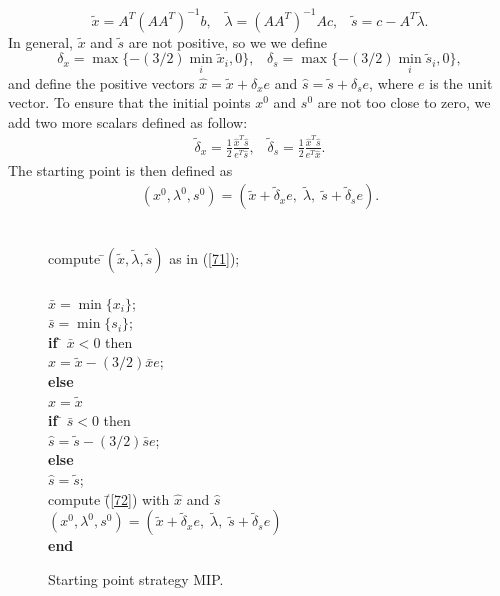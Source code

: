 \documentclass[a4paper,10 pt,titlepage,twoside]{book}
\theoremstyle{plain}
\theoremstyle{definition}
\theoremstyle{remark}
\begin{document}
\begin{equation}\label{71}
\tilde{x} = A^{T}(AA^{T})^{-1}b,\;\;\;\tilde{\lambda}=(AA^{T})^{-1}Ac,\;\;\; \tilde{s} = c- A^{T}\tilde{\lambda}.
\end{equation}
In general, $\tilde{x}$ and $\tilde{s}$ are not positive, so we we define
\begin{equation*}
\delta_{x} = \max\{-(3/2)\min\limits_{i}\tilde{x}_{i},0\},\;\;\; \delta_{s} = \max\{-(3/2)\min\limits_{i}\tilde{s}_{i},0\},
\end{equation*}
and define the positive vectors $\hat{x}= \tilde{x}+\delta_{x}e$ and $\hat{s}= \tilde{s}+\delta_{s}e$, where $e$ is the unit vector. To ensure that the initial points $x^{0}$ and $s^{0}$ are not too close to zero, we add two more scalars defined as follow:
\begin{align}\label{72}
\tilde{\delta}_{x}= \frac{1}{2}\frac{\hat{x}^{T}\hat{s}}{e^{T}\hat{s}},\;\;\;\tilde{\delta}_{s} =\frac{1}{2}\frac{\hat{x}^{T}\hat{s}}{e^{T}\hat{x}}.
\end{align}
The starting point is then defined as 
\begin{align*}
(x^{0}, \lambda^{0}, s^{0}) = (\tilde{x}+\tilde{\delta}_{x} e,\;\tilde{\lambda},\;\tilde{s}+\tilde{\delta}_{s} e).
\end{align*}
\\
\begin{figure}\caption{\label{fig:MIP}Starting point strategy MIP.}
	\centering
	{\noindent\begin{boxedminipage}{1\linewidth}
			\begin{tabbing}
			compute \=$(\tilde{x},\tilde{\lambda},\tilde{s})$ as in (\ref{71});\\				
			\=\\
				\>$\bar{x} = \min\{x_{i}\}$;\\
				\>$\bar{s} = \min\{s_{i}\}$;\\
				\textbf{if} \= $\bar{x}<0$ then\\
				\> $\hat{x}= \tilde{x} -(3/2)\bar{x}e$;\\
				\textbf{else} \=\\
				\> $\hat{x} = \tilde{x}$\\
				\textbf{if} \= $\bar{s}<0$ then\\
				\> $\hat{s}= \tilde{s} -(3/2)\bar{s}e$;\\
				\textbf{else} \=\\
				\> $\hat{s} = \tilde{s}$;\\
				compute \=(\ref{72}) with $\hat{x}$ and $\hat{s}$\\
				\>$(x^{0}, \lambda^{0}, s^{0}) = (\tilde{x}+\tilde{\delta}_{x} e,\;\tilde{\lambda},\;\tilde{s}+\tilde{\delta}_{s} e)$\\
				\textbf{end}
			\end{tabbing}
		\end{boxedminipage}
		} \quad
\end{figure}
\end{document}
